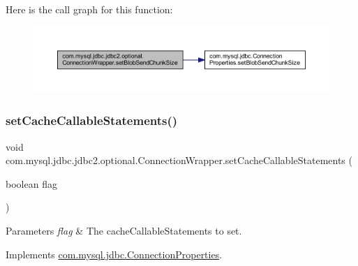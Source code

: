 Here is the call graph for this function\+:
\nopagebreak
\begin{figure}[H]
\begin{center}
\leavevmode
\includegraphics[width=350pt]{classcom_1_1mysql_1_1jdbc_1_1jdbc2_1_1optional_1_1_connection_wrapper_ad2a5eec9a52c3c5a68de2bc6af8f333e_cgraph}
\end{center}
\end{figure}
\mbox{\label{classcom_1_1mysql_1_1jdbc_1_1jdbc2_1_1optional_1_1_connection_wrapper_a0f60cd752383652f21a16f404ee107c2}} 
\subsubsection{\texorpdfstring{set\+Cache\+Callable\+Statements()}{setCacheCallableStatements()}}
{\footnotesize\ttfamily void com.\+mysql.\+jdbc.\+jdbc2.\+optional.\+Connection\+Wrapper.\+set\+Cache\+Callable\+Statements (\begin{DoxyParamCaption}\item[{boolean}]{flag }\end{DoxyParamCaption})}


\begin{DoxyParams}{Parameters}
{\em flag} & The cache\+Callable\+Statements to set. \\
\hline
\end{DoxyParams}


Implements \mbox{\hyperlink{interfacecom_1_1mysql_1_1jdbc_1_1_connection_properties_ae88f31bc280f1a82f70847797a0a25e7}{com.\+mysql.\+jdbc.\+Connection\+Properties}}.

